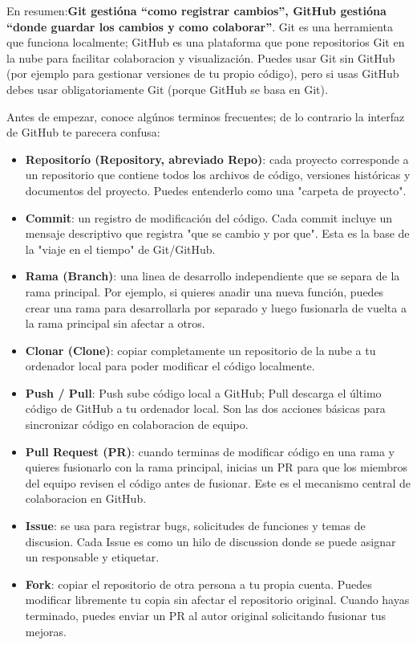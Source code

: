 En resumen:\textbf{Git gestióna “como registrar cambios”, GitHub gestióna “donde guardar los cambios y como colaborar”}. Git es una herramienta que funciona localmente; GitHub es una plataforma que pone repositorios Git en la nube para facilitar colaboracion y visualización. Puedes usar Git sin GitHub (por ejemplo para gestionar versiones de tu propio código), pero si usas GitHub debes usar obligatoriamente Git (porque GitHub se basa en Git).



Antes de empezar, conoce algúnos terminos frecuentes; de lo contrario la interfaz de GitHub te parecera confusa:

\begin{itemize}
  \item \textbf{Repositorío (Repository, abreviado Repo)}: cada proyecto corresponde a un repositorio que contiene todos los archivos de código, versiones históricas y documentos del proyecto. Puedes entenderlo como una "carpeta de proyecto".
  \item \textbf{Commit}: un registro de modificación del código. Cada commit incluye un mensaje descriptivo que registra "que se cambio y por que". Esta es la base de la "viaje en el tiempo" de Git/GitHub.
  \item \textbf{Rama (Branch)}: una linea de desarrollo independiente que se separa de la rama principal. Por ejemplo, si quieres anadir una nueva función, puedes crear una rama para desarrollarla por separado y luego fusionarla de vuelta a la rama principal sin afectar a otros.
  \item \textbf{Clonar (Clone)}: copiar completamente un repositorio de la nube a tu ordenador local para poder modificar el código localmente.
  \item \textbf{Push / Pull}: Push sube código local a GitHub; Pull descarga el último código de GitHub a tu ordenador local. Son las dos acciones básicas para sincronizar código en colaboracion de equipo.
  \item \textbf{Pull Request (PR)}: cuando terminas de modificar código en una rama y quieres fusionarlo con la rama principal, inicias un PR para que los miembros del equipo revisen el código antes de fusionar. Este es el mecanismo central de colaboracion en GitHub.
  \item \textbf{Issue}: se usa para registrar bugs, solicitudes de funciones y temas de discusion. Cada Issue es como un hilo de discussion donde se puede asignar un responsable y etiquetar.
  \item \textbf{Fork}: copiar el repositorio de otra persona a tu propia cuenta. Puedes modificar libremente tu copia sin afectar el repositorio original. Cuando hayas terminado, puedes enviar un PR al autor original solicitando fusionar tus mejoras.
\end{itemize}

